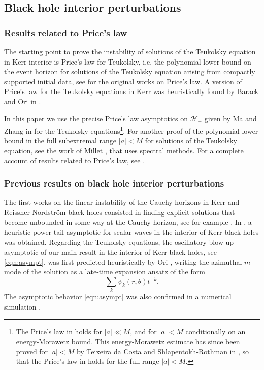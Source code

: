 \documentclass[reqno]{amsart}
\numberwithin{equation}{section}
\newcommand{\mch}{\mathcal{H}}
\theoremstyle{plain}
\theoremstyle{definition}
\theoremstyle{remark}
\numberwithin{equation}{section}
\begin{document}
\subsection{Black hole interior perturbations}\label{section:litterature}
\subsubsection{Results related to Price's law}
The starting point to prove the instability of solutions of the Teukolsky equation in Kerr interior is Price's law for Teukolsky, i.e. the polynomial lower bound on the event horizon for solutions of the Teukolsky equation arising from compactly supported initial data, see \cite{price1, price2, price3, price4} for the original works on Price's law. A version of Price's law for the Teukolsky equations in Kerr was heuristically found by Barack and Ori in \cite{barackori}. 

In this paper we use the precise Price's law asymptotics on $\mch_+$ given by Ma and Zhang in \cite{pricelaw} for the Teukolsky equations\footnote{The Price's law in \cite{pricelaw} holds for $|a|\ll M$, and for $|a|<M$ conditionally on an energy-Morawetz bound. This energy-Morawetz estimate has since been proved for $|a|<M$ by Teixeira da Costa and Shlapentokh-Rothman in \cite{TDCSR2, TDCSR1}, so that the Price's law in \cite{pricelaw} holds for the full range $|a|<M$.}. For another proof of the polynomial lower bound in the full subextremal range $|a|<M$ for solutions of the Teukolsky equation, see the work of Millet \cite{millet}, that uses spectral methods. For a complete account of results related to Price's law, see \cite{pricelaw}.

\subsubsection{Previous results on black hole interior perturbations}

The first works on the linear instability of the Cauchy horizons in Kerr and Reissner-Nordström black holes consisted in finding explicit solutions that become unbounded in some way at the Cauchy horizon, see for example \cite{mac}. In \cite{oriscalar}, a heuristic power tail asymptotic for scalar waves in the interior of Kerr black holes was obtained. Regarding the Teukolsky equations, the oscillatory blow-up asymptotic of our main result in the interior of Kerr black holes, see \eqref{eqn:asympt}, was first predicted heuristically by Ori \cite{ori}, writing the azimuthal $m$-mode of the solution as a late-time expansion ansatz of the form
$$\sum_k\psi_k(r,\theta)t^{-k}.$$
The asymptotic behavior \eqref{eqn:asympt} was also confirmed in a numerical simulation \cite{simunum}.
\end{document}
